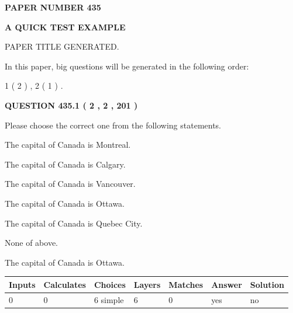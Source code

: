 \documentclass[12pt]{article}
\begin{document}
   
   
   
 {\textbf{ \Large{ PAPER NUMBER  435  }}}
   
   
\vspace{0.2in}
   
   
   
   
   
   
   
   
 \vspace{0.2in}
{\LARGE {\textbf{ A QUICK TEST EXAMPLE}}}
   
   
 PAPER TITLE GENERATED.
   
   
   
\vspace{0.2in}
   
In this paper, big questions will be generated in the following order: 
   
   
   1 ( 2 )
 ,
   2 ( 1 )
 .
  
\vspace{0.2in}
  
{\textbf{\Large{QUESTION
435.1 
 ( 2 , 2 , 201 )
}}}
  
  
Please choose the correct one from the following statements.
 
 
The capital of Canada is Montreal.
 
 
The capital of Canada is Calgary.
 
 
The capital of Canada is Vancouver.
 
 
The capital of Canada is Ottawa.
 
 
The capital of Canada is Quebec City.
 
 
 None of above.
 
 
\noindent{}
 
 
The capital of Canada is Ottawa.
 
 
\noindent{}
 
 
   
   
   
   
\noindent\begin{tabular}{|l|l|l|l|l|l|l|}
 \hline
Inputs & Calculates & Choices & Layers & Matches & Answer & Solution \\ \hline
 0  & 
 0  & 
 6
  simple  
  & 
 6  & 
 0  & 
  yes & 
  no 
  \\ \hline
 \end{tabular}
   
\end{document}
